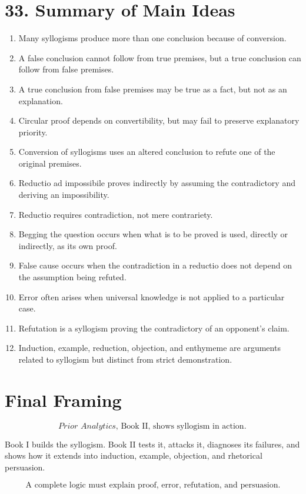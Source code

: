 \documentclass[12pt]{article}
\begin{document}
\section*{33. Summary of Main Ideas}

\begin{enumerate}[itemsep=0.5em]
    \item Many syllogisms produce more than one conclusion because of
    conversion.

    \item A false conclusion cannot follow from true premises, but a true
    conclusion can follow from false premises.

    \item A true conclusion from false premises may be true as a fact, but not
    as an explanation.

    \item Circular proof depends on convertibility, but may fail to preserve
    explanatory priority.

    \item Conversion of syllogisms uses an altered conclusion to refute one of
    the original premises.

    \item Reductio ad impossibile proves indirectly by assuming the
    contradictory and deriving an impossibility.

    \item Reductio requires contradiction, not mere contrariety.

    \item Begging the question occurs when what is to be proved is used,
    directly or indirectly, as its own proof.

    \item False cause occurs when the contradiction in a reductio does not
    depend on the assumption being refuted.

    \item Error often arises when universal knowledge is not applied to a
    particular case.

    \item Refutation is a syllogism proving the contradictory of an opponent's
    claim.

    \item Induction, example, reduction, objection, and enthymeme are arguments
    related to syllogism but distinct from strict demonstration.
\end{enumerate}

\section*{Final Framing}

\[
\boxed{
\textit{Prior Analytics}, \text{ Book II, shows syllogism in action.}
}
\]

Book I builds the syllogism. Book II tests it, attacks it, diagnoses its
failures, and shows how it extends into induction, example, objection, and
rhetorical persuasion.

\[
\boxed{
\text{A complete logic must explain proof, error, refutation, and persuasion.}
}
\]
\end{document}
